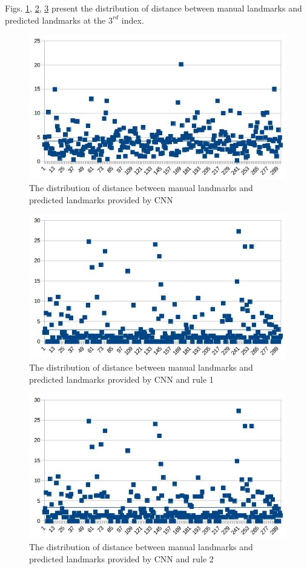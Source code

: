 \documentclass[12pt,a4paper]{article}
\begin{document}
Figs. \ref{wellpredicted31}, \ref{wellpredicted32}, \ref{wellpredicted33} present the distribution of distance between manual landmarks and predicted landmarks at the $3^{rd}$ index.
\begin{figure}[h!]
	\centering
	\includegraphics[scale=0.5]{images/dis_lm3_cnn}
	\caption{The distribution of distance between manual landmarks and predicted landmarks provided by CNN}
	\label{wellpredicted31}
\end{figure}
\begin{figure}[h!]
	\centering
	\includegraphics[scale=0.5]{images/dis_lm3_cnn_rule1}
	\caption{The distribution of distance between manual landmarks and predicted landmarks provided by CNN and rule 1}
	\label{wellpredicted32}
\end{figure}
\begin{figure}[h!]
	\centering
	\includegraphics[scale=0.5]{images/dis_lm3_cnn_rule2}
	\caption{The distribution of distance between manual landmarks and predicted landmarks provided by CNN and rule 2}
	\label{wellpredicted33}
\end{figure}~\\
\end{document}
